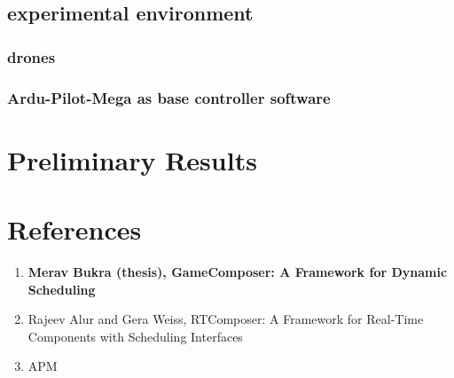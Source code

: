\documentclass[11pt]{article}
\begin{document}
\subsection{experimental environment}
\subsubsection{drones}
\subsubsection{Ardu-Pilot-Mega as base controller software}

\section{Preliminary Results}

\section{References}
\begin{enumerate}
\item \textbf{Merav Bukra (thesis), GameComposer: A Framework for Dynamic Scheduling}
\item Rajeev Alur and Gera Weiss, RTComposer: A Framework for Real-Time Components with Scheduling Interfaces
\item APM
\end{enumerate}
\end{document}
